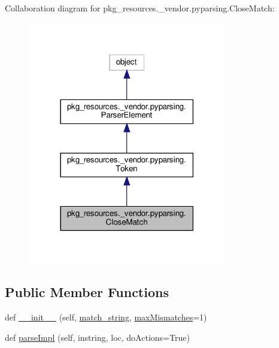 Collaboration diagram for pkg\+\_\+resources.\+\_\+vendor.\+pyparsing.\+Close\+Match\+:
\nopagebreak
\begin{figure}[H]
\begin{center}
\leavevmode
\includegraphics[width=246pt]{classpkg__resources_1_1__vendor_1_1pyparsing_1_1CloseMatch__coll__graph}
\end{center}
\end{figure}
\subsection*{Public Member Functions}
\begin{DoxyCompactItemize}
\item 
def \hyperlink{classpkg__resources_1_1__vendor_1_1pyparsing_1_1CloseMatch_ae8e321cbc22d9559d53155a0e533acb2}{\+\_\+\+\_\+init\+\_\+\+\_\+} (self, \hyperlink{classpkg__resources_1_1__vendor_1_1pyparsing_1_1CloseMatch_acce4c0b39d10c00108a16ab1628ff1aa}{match\+\_\+string}, \hyperlink{classpkg__resources_1_1__vendor_1_1pyparsing_1_1CloseMatch_a09058c80659100caec3f519c53d274c6}{max\+Mismatches}=1)
\item 
def \hyperlink{classpkg__resources_1_1__vendor_1_1pyparsing_1_1CloseMatch_a9a8d036ae102bce8ab97932588087447}{parse\+Impl} (self, instring, loc, do\+Actions=True)
\end{DoxyCompactItemize}
